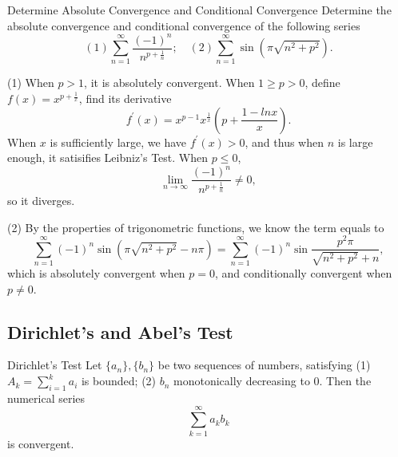 \begin{example}{Determine Absolute Convergence and Conditional Convergence}{}
  Determine the absolute convergence and conditional convergence of the
  following series
  \begin{equation}
    (1) \sum\limits_{n = 1}^{\infty} \frac{(-1)^n}{n^{p+\frac{1}{n}}}; \quad
    (2) \sum\limits_{n = 1}^{\infty} \sin (\pi \sqrt{n^2 + p^2}).
  \end{equation}
\end{example}

\begin{solution}
  (1) When $p > 1$, it is absolutely convergent.
  When $1 \geq p > 0$, define $f(x) = x^{p + \frac{1}{x}}$,
  find its derivative
  \begin{equation}
    f^{\prime}(x) = x^{p-1}x^{\frac{1}{x}} \left( p + \frac{1 - ln x}{x} \right).
  \end{equation}
  When $x$ is sufficiently large, we have $f^{\prime}(x) > 0$,
  and thus when $n$ is large enough, it satisifies Leibniz's Test.
  When $p \leq 0$,
  \begin{equation}
    \lim \limits _{n \rightarrow \infty} \frac{(-1)^n}{n^{p + \frac{1}{n}}} \neq 0,
  \end{equation}
  so it diverges.

  (2) By the properties of trigonometric functions, we know
  the term equals to
  \begin{equation}
    \sum\limits_{n = 1}^{\infty} (-1)^n \sin (\pi \sqrt{n^2 + p^2} - n\pi)
    = \sum\limits_{n = 1}^{\infty}(-1)^n \sin \frac{p^2 \pi}{\sqrt{n^2 + p^2} + n},
  \end{equation}
  which is absolutely convergent when $p = 0$,
  and conditionally convergent when $p \neq 0$.
\end{solution}

\subsection{Dirichlet's and Abel's Test}

\begin{theorem}{Dirichlet's Test}{}
  Let $\{a_n\}, \{b_n\}$ be two sequences of numbers,
  satisfying
  (1) $A_k = \sum\limits_{i = 1}^k a_i$ is bounded;
  (2) $b_n$ monotonically decreasing to $0$.
  Then the numerical series
  \begin{equation}
    \sum\limits_{k = 1}^{\infty} a_kb_k
  \end{equation}
  is convergent.
\end{theorem}


